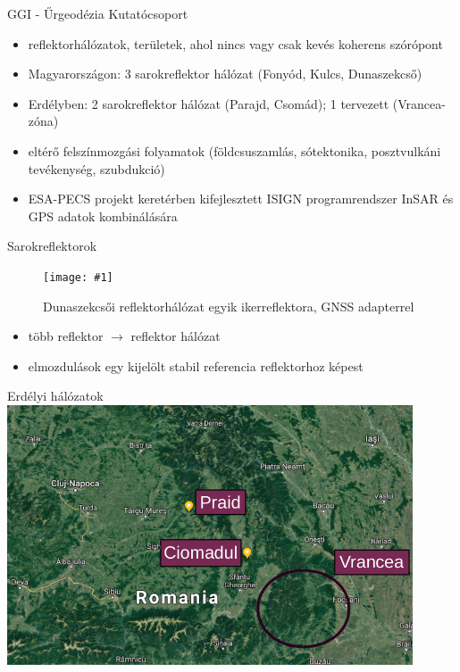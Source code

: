 \documentclass{beamer}
\newcommand\figu[3]{
    \begin{figure}
        \texttt{[image: \#1]}
        \caption{#3}
    \end{figure}
}
\begin{document}
\begin{frame}{GGI - Űrgeodézia Kutatócsoport}

\begin{itemize}
    \item reflektorhálózatok, területek, ahol nincs vagy csak kevés
    koherens szórópont
    \item Magyarországon: 3 sarokreflektor hálózat (Fonyód, Kulcs, Dunaszekcső)
    \item Erdélyben: 2 sarokreflektor hálózat (Parajd, Csomád);
    1 tervezett (Vrancea-zóna)
    \item eltérő felszínmozgási folyamatok (földcsuszamlás, sótektonika,
    posztvulkáni tevékenység, szubdukció)
    \item ESA-PECS projekt keretérben kifejlesztett ISIGN programrendszer
    InSAR és GPS adatok kombinálására
\end{itemize}

\end{frame}


\begin{frame}{Sarokreflektorok}

\begin{center}
    \figu{dszekcso_refl_3.jpg}{0.75}{Dunaszekcsői reflektorhálózat egyik
          ikerreflektora, GNSS adapterrel}
\end{center}


\begin{itemize}
    \item több reflektor $\rightarrow$ reflektor hálózat
    \item elmozdulások egy kijelölt stabil referencia reflektorhoz képest
\end{itemize}

\end{frame}


\begin{frame}{Erdélyi hálózatok}
\includegraphics[width=0.9\textwidth]{praid_ciomadul.png}
\end{frame}
\end{document}
